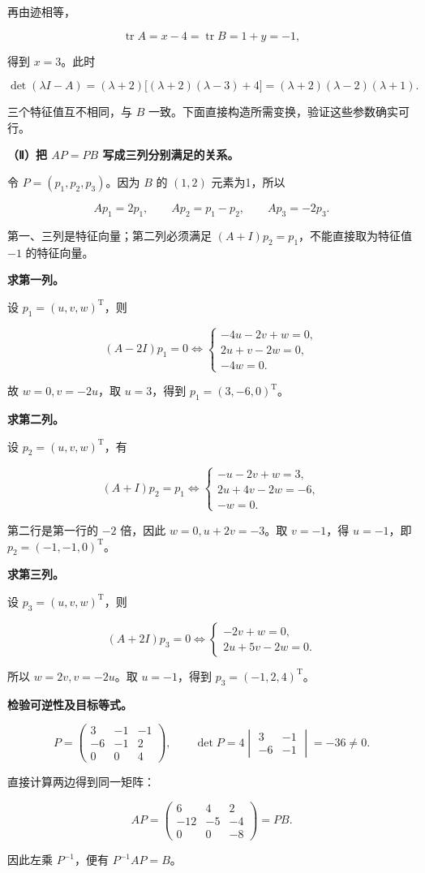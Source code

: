 \documentclass[UTF8,11pt,fontset=windows]{ctexart}
\begin{document}
再由迹相等，

$$
\operatorname{tr}A=x-4=\operatorname{tr}B=1+y=-1,
$$

得到 $x=3$。此时

$$
\det(\lambda I-A)
=(\lambda+2)\bigl[(\lambda+2)(\lambda-3)+4\bigr]
=(\lambda+2)(\lambda-2)(\lambda+1).
$$

三个特征值互不相同，与 $B$ 一致。下面直接构造所需变换，验证这些参数确实可行。

\textbf{（Ⅱ）把 $AP=PB$ 写成三列分别满足的关系。}

令 $P=(p_1,p_2,p_3)$。因为 $B$ 的 $(1,2)$ 元素为1，所以

$$
Ap_1=2p_1,\qquad Ap_2=p_1-p_2,\qquad Ap_3=-2p_3.
$$

第一、三列是特征向量；第二列必须满足 $(A+I)p_2=p_1$，不能直接取为特征值 $-1$ 的特征向量。

\textbf{求第一列。}

设 $p_1=(u,v,w)^{\mathrm T}$，则

$$
(A-2I)p_1=0
\iff
\begin{cases}
-4u-2v+w=0,\\
2u+v-2w=0,\\
-4w=0.
\end{cases}
$$

故 $w=0,v=-2u$，取 $u=3$，得到 $p_1=(3,-6,0)^{\mathrm T}$。

\textbf{求第二列。}

设 $p_2=(u,v,w)^{\mathrm T}$，有

$$
(A+I)p_2=p_1
\iff
\begin{cases}
-u-2v+w=3,\\
2u+4v-2w=-6,\\
-w=0.
\end{cases}
$$

第二行是第一行的 $-2$ 倍，因此 $w=0,u+2v=-3$。取 $v=-1$，得 $u=-1$，即 $p_2=(-1,-1,0)^{\mathrm T}$。

\textbf{求第三列。}

设 $p_3=(u,v,w)^{\mathrm T}$，则

$$
(A+2I)p_3=0
\iff
\begin{cases}
-2v+w=0,\\
2u+5v-2w=0.
\end{cases}
$$

所以 $w=2v,v=-2u$。取 $u=-1$，得到 $p_3=(-1,2,4)^{\mathrm T}$。

\textbf{检验可逆性及目标等式。}

$$
\boxed{P=\begin{pmatrix}3&-1&-1\\-6&-1&2\\0&0&4\end{pmatrix}},
\qquad \det P=4\begin{vmatrix}3&-1\\-6&-1\end{vmatrix}=-36\ne0.
$$

直接计算两边得到同一矩阵：

$$
AP=\begin{pmatrix}6&4&2\\-12&-5&-4\\0&0&-8\end{pmatrix}=PB.
$$

因此左乘 $P^{-1}$，便有 $\boxed{P^{-1}AP=B}$。
\end{document}
